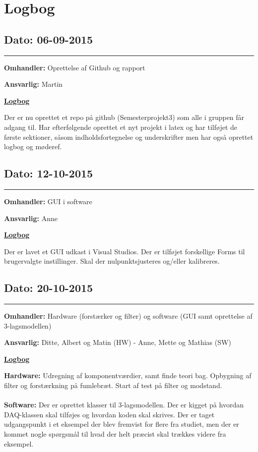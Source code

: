 \chapter{Logbog}

\section{Dato: 06-09-2015}
\hrule
\textbf{Omhandler:} Oprettelse af Github og rapport

\textbf{Ansvarlig:} Martin

\underline{\textbf{Logbog}}


Der er nu oprettet et repo på github (Semesterprojekt3) som alle i gruppen får adgang til. Har efterfølgende oprettet et nyt projekt i latex og har tilføjet de første sektioner, såsom indholdsfortegnelse og underskrifter men har også oprettet logbog og møderef.

\section{Dato: 12-10-2015}
\hrule
\textbf{Omhandler:} GUI i software 

\textbf{Ansvarlig:} Anne

\underline{\textbf{Logbog}}

Der er lavet et GUI udkast i Visual Studios. Der er tilføjet forskellige Forms til brugervalgte instillinger. Skal der nulpunktsjusteres og/eller kalibreres.

\section{Dato: 20-10-2015}
\hrule
\textbf{Omhandler:} Hardware (forstærker og filter) og software (GUI samt oprettelse af 3-lagsmodellen) 

\textbf{Ansvarlig:} Ditte, Albert og Matin (HW) - Anne, Mette og Mathias (SW)

\underline{\textbf{Logbog}}

\textbf{Hardware:} Udregning af komponentværdier, samt finde teori bag. Opbygning af filter og forstærkning på fumlebræt. Start af test på filter og modstand. \\
\\ 
\textbf{Software:} Der er oprettet klasser til 3-lagsmodellen. Der er kigget på hvordan DAQ-klassen skal tilføjes og hvordan koden skal skrives. Der er taget udgangspunkt i et eksempel der blev fremvist for flere fra studiet, men der er kommet nogle spørgsmål til hvad der helt præcist skal trækkes videre fra eksempel.
\newpage
